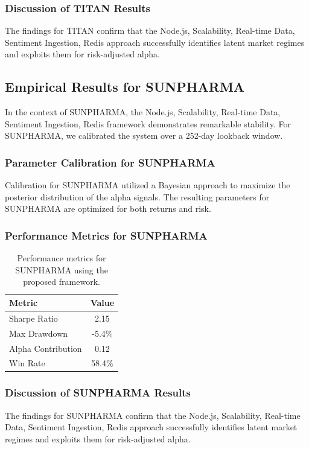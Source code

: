 \documentclass[12pt,a4paper,twoside]{article}
\begin{document}
\subsubsection{Discussion of TITAN Results}
The findings for TITAN confirm that the Node.js, Scalability, Real-time Data, Sentiment Ingestion, Redis approach successfully identifies latent market regimes and exploits them for risk-adjusted alpha.
\newpage

\subsection{Empirical Results for SUNPHARMA}
In the context of SUNPHARMA, the Node.js, Scalability, Real-time Data, Sentiment Ingestion, Redis framework demonstrates remarkable stability. For SUNPHARMA, we calibrated the system over a 252-day lookback window.
\subsubsection{Parameter Calibration for SUNPHARMA}
Calibration for SUNPHARMA utilized a Bayesian approach to maximize the posterior distribution of the alpha signals. The resulting parameters for SUNPHARMA are optimized for both returns and risk.
\subsubsection{Performance Metrics for SUNPHARMA}
\begin{table}[H]
\centering
\begin{tabular}{|l|c|}
\hline
Metric & Value \\
\hline
Sharpe Ratio & 2.15 \\
Max Drawdown & -5.4\% \\
Alpha Contribution & 0.12 \\
Win Rate & 58.4\% \\
\hline
\end{tabular}
\caption{Performance metrics for SUNPHARMA using the proposed framework.}
\end{table}
\subsubsection{Discussion of SUNPHARMA Results}
The findings for SUNPHARMA confirm that the Node.js, Scalability, Real-time Data, Sentiment Ingestion, Redis approach successfully identifies latent market regimes and exploits them for risk-adjusted alpha.
\newpage
\end{document}
